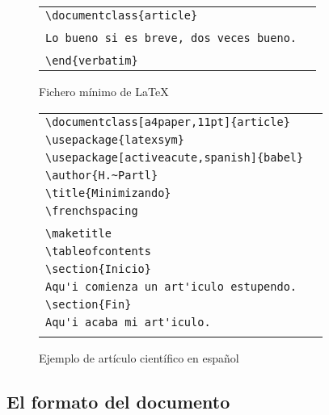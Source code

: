 \begin{figure}[htbp]
\centering
\begin{tabular}{lp{10cm}}
	\hline
		\verb+\documentclass{article}+\\
		\verb++\\
		\verb+Lo bueno si es breve, dos veces bueno.+\\
		\verb++\\	
		\verb+\end{verbatim}+\\
	\hline
\end{tabular}
\caption{Fichero m\'inimo de \LaTeX{}}
\label{fig:minimo}
\end{figure}

\begin{figure}[htbp]
\centering
\begin{tabular}{lp{10cm}}
	\hline
		\verb+\documentclass[a4paper,11pt]{article}+\\
		\verb+\usepackage{latexsym}+\\
		\verb+\usepackage[activeacute,spanish]{babel}+\\
		\verb+\author{H.~Partl}+\\	
		\verb+\title{Minimizando} +\\
		\verb+\frenchspacing+\\
		\verb++\\
		\verb+\maketitle+\\
		\verb+\tableofcontents+\\
		\verb+\section{Inicio}+\\
		\verb+Aqu'i comienza un art'iculo estupendo.+\\
		\verb+\section{Fin}+\\
		\verb+Aqu'i acaba mi art'iculo.+\\
		\verb++\\
	\hline
\end{tabular}
\caption{Ejemplo de art\'iculo cient\'ifico en espa\~nol}
\label{fig:articulo}
\end{figure}
		
		\subsection{El formato del documento}
